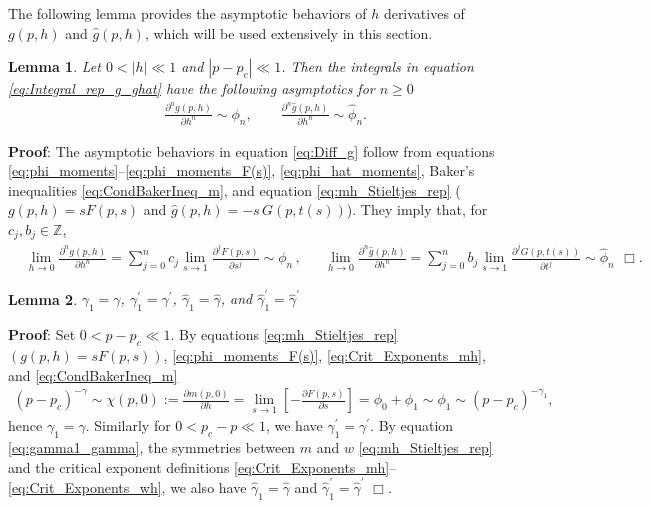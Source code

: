 \documentclass[english,12pt,jmp,graphicx]{revtex4-1}
\newtheorem{lemma}{Lemma}[section]
\newcommand{\ph}{\hat{\phi}}
\newcommand{\gh}{\hat{\gamma}}
\begin{document}
The following lemma provides the asymptotic behaviors of $h$
derivatives of $g(p,h)$ and $\hat{g}(p,h)$, which will be used
extensively in this section. 
\begin{lemma}\label{lem:h_diff_commutation}
   Let $0<|h|\ll1$ and $|p-p_c|\ll1$. Then the integrals in equation
   \eqref{eq:Integral_rep_g_ghat} have the following asymptotics for $n\geq0$
\begin{align}\label{eq:Diff_g}
  &\frac{\partial^ng(p,h)}{\partial h^n}\sim\phi_n, \qquad \frac{\partial^n\hat{g}(p,h)}{\partial h^n}\sim\ph_n.
\end{align}
\end{lemma}
%
\noindent \textbf{Proof}:
%
The asymptotic behaviors in equation
\eqref{eq:Diff_g} follow from equations
\eqref{eq:phi_moments}--\eqref{eq:phi_moments_F(s)},
\eqref{eq:phi_hat_moments}, Baker's inequalities
\eqref{eq:CondBakerIneq_m}, and equation \eqref{eq:mh_Stieltjes_rep}
 ($g(p,h)=sF(p,s)$ and $\hat{g}(p,h)=-s\,G(p,t(s))$).
They imply that, for $c_j,b_j\in\mathbb{Z}$,  
%
\begin{align*}%
  &\lim_{h\to0}\frac{\partial^ng(p,h)}{\partial h^n}
         =\sum_{j=0}^nc_j\lim_{s\to1}\frac{\partial^jF(p,s)}{\partial s^j}\sim\phi_n\,,
  &&
  \lim_{h\to0}\frac{\partial^n\hat{g}(p,h)}{\partial h^n}
         =\sum_{j=0}^nb_j\lim_{s\to1}\frac{\partial^jG(p,t(s))}{\partial t^j}\sim\ph_n\, \ \Box.      
\end{align*}
\begin{lemma}\label{lem:nonzero_gamma1_etc}
  $\gamma_1=\gamma$, $\gamma_1^\prime=\gamma^\prime$, $\gh_1=\gh$, and $\gh_1^\prime=\gh^\prime$
\end{lemma}
%
\noindent \textbf{Proof}:
%
Set $0<p-p_c\ll1$. By equations \eqref{eq:mh_Stieltjes_rep}
$(g(p,h)=sF(p,s))$, \eqref{eq:phi_moments_F(s)},
\eqref{eq:Crit_Exponents_mh}, and \eqref{eq:CondBakerIneq_m} 
%
\begin{align}\label{eq:gamma1_gamma}
  (p-p_c)^{-\gamma}\sim\chi(p,0)
          :=\frac{\partial m(p,0)}{\partial h}
          =\lim_{s\to1}\left[-\frac{\partial F(p,s)}{\partial s}\right]
          =\phi_0+\phi_1
          \sim\phi_1\sim(p-p_c)^{-\gamma_1},
\end{align}
%
hence $\gamma_1=\gamma$. Similarly for $0<p_c-p\ll1$, we have $\gamma_1^\prime=\gamma^\prime$. By
equation \eqref{eq:gamma1_gamma}, the symmetries between $m$ and
$w$ \eqref{eq:mh_Stieltjes_rep} and the critical exponent definitions 
\eqref{eq:Crit_Exponents_mh}--\eqref{eq:Crit_Exponents_wh}, we also
have $\gh_1=\gh$ and $\gh_1^\prime=\gh^\prime$ $\Box$.   
\end{document}
